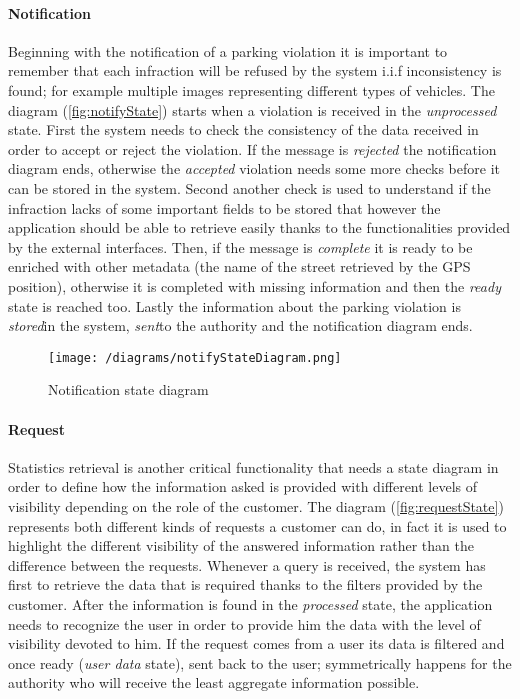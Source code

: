 	\paragraph{Notification}
		Beginning with the notification of a parking violation it is important to remember that each infraction will be refused by the system i.i.f inconsistency is found; for example multiple images representing different types of vehicles.
		The diagram (\autoref{fig:notifyState}) starts when a violation is received in the \textit{unprocessed} state. First the system needs to check the consistency of the data received in order to accept or reject the violation. If the message is \textit{rejected} the notification diagram ends, otherwise the \textit{accepted} violation needs some more checks before it can be stored in the system. Second another check is used to understand if the infraction lacks of some important fields to be stored that however the application should be able to retrieve easily thanks to the functionalities provided by the external interfaces. Then, if the message is \textit{complete} it is ready to be enriched with other metadata (the name of the street retrieved by the GPS position), otherwise it is completed with missing information and then the \textit{ready} state is reached too. Lastly the information about the parking violation is \textit{stored}in the system, \textit{sent}to the authority and the notification diagram ends.
		
		\vspace{0.3cm}
		\begin{figure}[h]
			\centering
			\texttt{[image: /diagrams/notifyStateDiagram.png]}
			\caption{\label{fig:notifyState}Notification state diagram}
		\end{figure}
	
	\paragraph{Request}
		Statistics retrieval is another critical functionality that needs a state diagram in order to define how the information asked is provided with different levels of visibility depending on the role of the customer.
		The diagram (\autoref{fig:requestState}) represents both different kinds of requests a customer can do, in fact it is used to highlight the different visibility of the answered information rather than the difference between the requests. Whenever a query is received, the system has first to retrieve the data that is required thanks to the filters provided by the customer. After the information is found in the \textit{processed} state, the application needs to recognize the user in order to provide him the data with the level of visibility devoted to him. If the request comes from a user its data is filtered and once ready (\textit{user data} state), sent back to the user; symmetrically happens for the authority who will receive the least aggregate information possible. 
		
